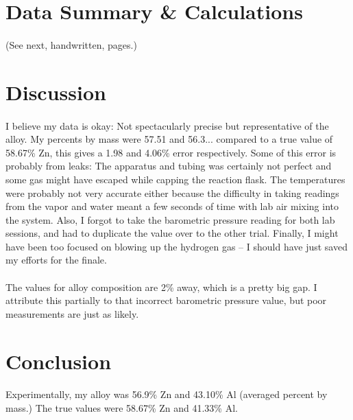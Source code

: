 \documentclass[fleqn,titlepage]{article}
\begin{document}
\section*{Data Summary \& Calculations}
  \paragraph{} (See next, handwritten, pages.)

\newpage
\section*{Discussion}
\paragraph{} I believe my data is okay: Not spectacularly precise but representative of the alloy. My percents by mass were 57.51 and 56.3... compared to a true value of 58.67\% Zn, this gives a 1.98 and 4.06\% error respectively. Some of this error is probably from leaks: The apparatus and tubing was certainly not perfect and some gas might have escaped while capping the reaction flask. The temperatures were probably not very accurate either because the difficulty in taking readings from the vapor and water meant a few seconds of time with lab air mixing into the system. Also, I forgot to take the barometric pressure reading for both lab sessions, and had to duplicate the value over to the other trial. Finally, I might have been too focused on blowing up the hydrogen gas -- I should have just saved my efforts for the finale.
\paragraph{} The values for alloy composition are 2\% away, which is a pretty big gap. I attribute this partially to that incorrect barometric pressure value, but poor measurements are just as likely.

\section*{Conclusion}
\paragraph{} Experimentally, my alloy was 56.9\% Zn and 43.10\% Al (averaged percent by mass.) The true values were 58.67\% Zn and 41.33\% Al.
\end{document}
